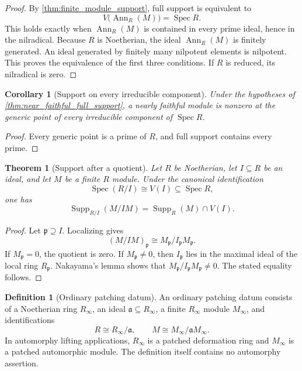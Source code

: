 \documentclass{aomart}
\newtheorem{theorem}{Theorem}[section]
\newtheorem{corollary}[corollary]{Corollary}
\theoremstyle{definition}
\newtheorem{definition}[definition]{Definition}
\theoremstyle{remark}
\newcommand{\Spec}{\operatorname{Spec}}
\newcommand{\Supp}{\operatorname{Supp}}
\newcommand{\Ann}{\operatorname{Ann}}
\newcommand{\frakp}{\mathfrak p}
\newcommand{\fraka}{\mathfrak a}
\begin{document}
\begin{proof}
By \cref{thm:finite_module_support}, full support is equivalent to
\[
V\bigl(\Ann_R(M)\bigr)=\Spec R.
\]
This holds exactly when \(\Ann_R(M)\) is contained in every prime ideal, hence in the nilradical. Because \(R\) is Noetherian, the ideal \(\Ann_R(M)\) is finitely generated. An ideal generated by finitely many nilpotent elements is nilpotent. This proves the equivalence of the first three conditions. If \(R\) is reduced, its nilradical is zero.
\end{proof}

\begin{corollary}[Support on every irreducible component]\label{cor:every_component_support}
Under the hypotheses of \cref{thm:near_faithful_full_support}, a nearly faithful module is nonzero at the generic point of every irreducible component of \(\Spec R\).
\end{corollary}

\begin{proof}
Every generic point is a prime of \(R\), and full support contains every prime.
\end{proof}

\begin{theorem}[Support after a quotient]\label{thm:quotient_support}
Let \(R\) be Noetherian, let \(I\subseteq R\) be an ideal, and let \(M\) be a finite \(R\) module. Under the canonical identification
\[
\Spec(R/I)\cong V(I)\subseteq\Spec R,
\]
one has
\[
\boxed{
\Supp_{R/I}(M/IM)
=
\Supp_R(M)\cap V(I).
}
\]
\end{theorem}

\begin{proof}
Let \(\frakp\supseteq I\). Localizing gives
\[
(M/IM)_{\frakp}
\cong
M_{\frakp}/I_{\frakp}M_{\frakp}.
\]
If \(M_{\frakp}=0\), the quotient is zero. If \(M_{\frakp}\neq0\), then
\(I_{\frakp}\) lies in the maximal ideal of the local ring \(R_{\frakp}\). Nakayama's lemma shows that
\(M_{\frakp}/I_{\frakp}M_{\frakp}\neq0\). The stated equality follows.
\end{proof}

\begin{definition}[Ordinary patching datum]\label{def:ordinary_patching_datum}
An ordinary patching datum consists of a Noetherian ring \(R_\infty\), an ideal
\(\fraka\subseteq R_\infty\), a finite \(R_\infty\) module \(M_\infty\), and identifications
\[
R\cong R_\infty/\fraka,
\qquad
M\cong M_\infty/\fraka M_\infty.
\]
In automorphy lifting applications, \(R_\infty\) is a patched deformation ring and \(M_\infty\) is a patched automorphic module. The definition itself contains no automorphy assertion.
\end{definition}
\end{document}
